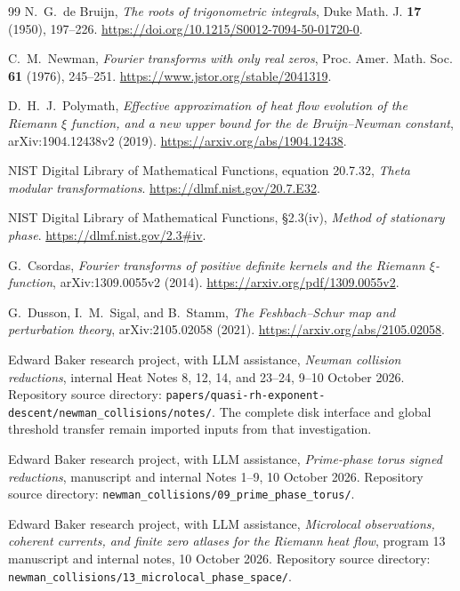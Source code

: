 \documentclass[11pt]{article}
\theoremstyle{definition}
\theoremstyle{remark}
\begin{document}
\begin{thebibliography}{99}
N.~G.~de Bruijn, \emph{The roots of trigonometric integrals},
Duke Math. J. \textbf{17} (1950), 197--226.
\url{https://doi.org/10.1215/S0012-7094-50-01720-0}.

C.~M.~Newman, \emph{Fourier transforms with only real zeros},
Proc. Amer. Math. Soc. \textbf{61} (1976), 245--251.
\url{https://www.jstor.org/stable/2041319}.

D.~H.~J.~Polymath, \emph{Effective approximation of heat flow evolution
of the Riemann $\xi$ function, and a new upper bound for the
de Bruijn--Newman constant}, arXiv:1904.12438v2 (2019).
\url{https://arxiv.org/abs/1904.12438}.

NIST Digital Library of Mathematical Functions, equation 20.7.32,
\emph{Theta modular transformations}.
\url{https://dlmf.nist.gov/20.7.E32}.

NIST Digital Library of Mathematical Functions, \S2.3(iv),
\emph{Method of stationary phase}.
\url{https://dlmf.nist.gov/2.3#iv}.

G.~Csordas, \emph{Fourier transforms of positive definite kernels
and the Riemann $\xi$-function}, arXiv:1309.0055v2 (2014).
\url{https://arxiv.org/pdf/1309.0055v2}.

G.~Dusson, I.~M.~Sigal, and B.~Stamm,
\emph{The Feshbach--Schur map and perturbation theory},
arXiv:2105.02058 (2021).
\url{https://arxiv.org/abs/2105.02058}.

Edward Baker research project, with LLM assistance,
\emph{Newman collision reductions}, internal Heat Notes 8, 12, 14,
and 23--24, 9--10 October 2026. Repository source directory:
\texttt{papers/quasi-rh-exponent-descent/newman\_collisions/notes/}.
The complete disk interface and global threshold transfer remain imported
inputs from that investigation.

Edward Baker research project, with LLM assistance,
\emph{Prime-phase torus signed reductions}, manuscript and internal
Notes 1--9, 10 October 2026. Repository source directory:
\texttt{newman\_collisions/09\_prime\_phase\_torus/}.

Edward Baker research project, with LLM assistance,
\emph{Microlocal observations, coherent currents, and finite zero atlases
for the Riemann heat flow}, program 13 manuscript and internal notes,
10 October 2026. Repository source directory:
\texttt{newman\_collisions/13\_microlocal\_phase\_space/}.


\end{thebibliography}
\end{document}
